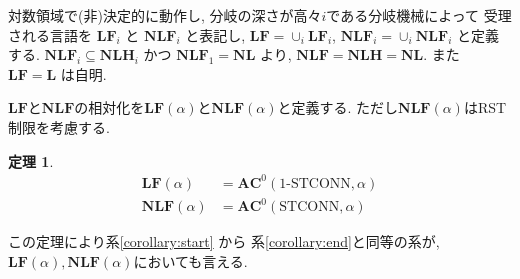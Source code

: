 \documentclass[11pt,a4paper]{jsarticle}
\theoremstyle{definition}
\newtheorem{theorem}{定理}%
\theoremstyle{remark}
\newcommand{\classfont}{\mathbf}
\newcommand{\AC}{\classfont{AC}}
\renewcommand{\L}{\classfont{L}}
\newcommand{\NL}{\classfont{NL}}
\newcommand{\NLH}{\classfont{NLH}}
\newcommand{\cfL}{\classfont{LF}}
\newcommand{\cfNL}{\classfont{NLF}}
\newcommand{\probfont}{\text}
\newcommand{\oneSTCONN}{\probfont{1-STCONN}}
\newcommand{\STCONN}{\probfont{STCONN}}
\begin{document}
対数領域で(非)決定的に動作し, 分岐の深さが高々$i$である分岐機械によって
受理される言語を $\cfL_i$ と $\cfNL_i$ と表記し,
$\cfL = \cup_i \cfL_i$, $\cfNL_i = \cup_i \cfNL_i$ と定義する.
$\cfNL_i \subseteq \NLH_i$ かつ $\cfNL_1 = \NL$ より,
$\cfNL = \NLH = \NL$. また $\cfL = \L$ は自明.

$\cfL$と$\cfNL$の相対化を$\cfL(\alpha)$と$\cfNL(\alpha)$と定義する.
ただし$\cfNL(\alpha)$はRST制限を考慮する.
\begin{theorem}
 \begin{align*}
  \cfL(\alpha) &= \AC^0(\oneSTCONN, \alpha)
  \\
  \cfNL(\alpha) &= \AC^0(\STCONN, \alpha)
 \end{align*}  
\end{theorem}

この定理により系\ref{corollary:start} から 系\ref{corollary:end}と同等の系が,
$\cfL(\alpha), \cfNL(\alpha)$においても言える.
\end{document}
